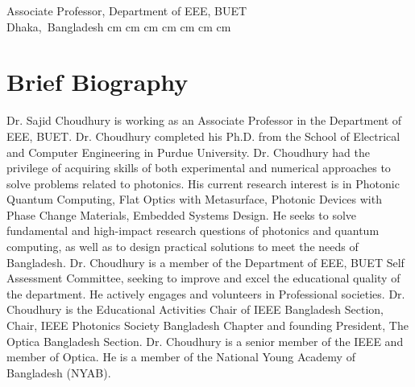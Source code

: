 \documentclass[cvauthor={Dr. Sajid Muhaimin Choudhury}]{buetcv}
\begin{document}
    \placelastupdatedtext %
    \begin{header}
        \fontsize{30 pt}{30 pt}
        \textbf{\cvauthor}

        \vspace{0.2 cm}
        \fontsize{20 pt}{20 pt}
        Associate Professor, Department of EEE, BUET \\
        \vspace{0.2 cm}        
        \normalsize
        \mbox{{\footnotesize\faMapMarker*}\hspace*{0.13cm}Dhaka, Bangladesh}%
         cm%
        \AND%
         cm%
        \mbox{}%
         cm%
        \AND%
         cm%
        \mbox{}%
         cm%
        \AND%
         cm%
        \mbox{}%
         cm%
    \end{header}

    \vspace{0.3 cm - 0.3 cm}


    \section{Brief Biography}
        \begin{onecolentry}
            Dr. Sajid Choudhury is working as an Associate Professor in the Department of EEE, BUET. Dr. Choudhury completed his Ph.D. from the School of Electrical and Computer Engineering in Purdue University. Dr. Choudhury had the privilege of acquiring skills of both experimental and numerical approaches to solve problems related to photonics. His current research interest is in Photonic Quantum Computing, Flat Optics with Metasurface, Photonic Devices with Phase Change Materials, Embedded Systems Design. He seeks to solve fundamental and high-impact research questions of photonics and quantum computing, as well as to design practical solutions to meet the needs of Bangladesh. Dr. Choudhury is a member of the Department of EEE, BUET Self Assessment Committee, seeking to improve and excel the educational quality of the department. He actively engages and volunteers in Professional societies. Dr. Choudhury is the Educational Activities Chair of IEEE Bangladesh Section, Chair, IEEE Photonics Society Bangladesh Chapter and founding President, The Optica Bangladesh Section. Dr. Choudhury is a senior member of the IEEE and member of Optica. He is a member of the National Young Academy of Bangladesh (NYAB).
        \end{onecolentry}
\end{document}
